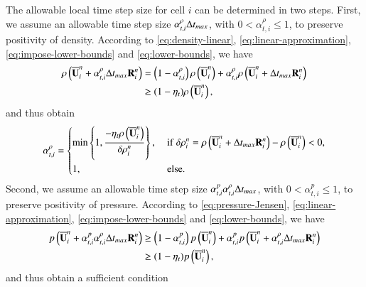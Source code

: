 The allowable local time step size for cell $i$ can be determined in two steps.
First, we assume an allowable time step size
$\alpha_{t,i}^{\rho} \mathrm\Delta t_{max}$, with $0 <\alpha_{t,i}^{\rho}\leq 1$, to preserve positivity of density. According to \eqref{eq:density-linear}, \eqref{eq:linear-approximation}, \eqref{eq:impose-lower-bounds} and \eqref{eq:lower-bounds}, we have
\begin{equation}
\label{eq:alpha-t-rho-ineq}
    \begin{split}
        \rho\left(\overline{\mathbf{U}}^n_i + \alpha_{t,i}^{\rho} \mathrm\Delta t_{max} \mathbf{R}^n_i\right) &= \left(1- \alpha_{t,i}^{\rho}\right)\rho\left(\overline{\mathbf{U}}^n_i\right) + \alpha_{t,i}^{\rho} \rho\left(\overline{\mathbf{U}}^n_i + \mathrm\Delta t_{max} \mathbf{R}^n_i\right) \\
    &\geq
    (1- \eta_t)
    \rho\left(\overline{\mathbf{U}}_i^n\right),
    \end{split}
\end{equation}
and thus obtain
\begin{equation}
\label{eq:alpha-t-rho}
    \alpha_{t,i}^{\rho} = \begin{dcases}
    \min\left\{1, \dfrac{-\eta_t \rho\left(\UM^n_i\right)}{\delta \rho^n_i} \right\}, & \
        \mathrm{if} \ 
        \delta \rho^n_i= \rho\left(\UM^n_i + \inc t_{max} \R^n_i\right) - \rho\left(\UM^n_i\right) < 0,
        \\
        1,  & \ \mathrm{else}.
    \end{dcases}
\end{equation}
Second, we assume an allowable time step size
$\alpha_{t,i}^{p}  \alpha_{t,i}^{\rho} \mathrm\Delta t_{max}$, with $0<\alpha_{t,i}^{p} \leq 1$,
to preserve positivity of pressure. According to \eqref{eq:pressure-Jensen}, \eqref{eq:linear-approximation}, \eqref{eq:impose-lower-bounds} and \eqref{eq:lower-bounds}, we have
\begin{equation}
\begin{split}
    p\left(\overline{\mathbf{U}}^n_i +  \alpha_{t,i}^{p} \alpha_{t,i}^{\rho} \mathrm\Delta t_{max} \mathbf{R}^n_i\right) &\geq \left(1-\alpha_{t,i}^{p}\right)p\left(\overline{\mathbf{U}}^n_i\right) + \alpha_{t,i}^{p} p\left(\overline{\mathbf{U}}^n_i + \alpha_{t,i}^{\rho} \mathrm\Delta t_{max} \mathbf{R}^n_i\right) \\
    &\geq
    (1- \eta_t)
    p\left(\overline{\mathbf{U}}_i^n\right),
\end{split}
\end{equation}
and thus obtain a sufficient condition
